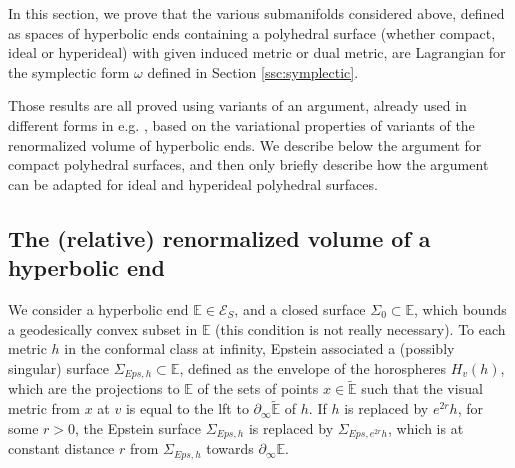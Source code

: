 \documentclass[notitlepage,twoside,a4paper]{amsart}
\theoremstyle{named}
\newcommand{\bE}{{\mathbb E}}
\newcommand{\cE}{{\mathcal E}}
\newcommand{\Sigeps}[1]{{\Sigma_{Eps,#1}}}
\begin{document}
In this section, we prove that the various submanifolds considered above, defined as spaces of hyperbolic ends containing a polyhedral surface (whether compact, ideal or hyperideal) with given induced metric or dual metric, are Lagrangian for the symplectic form $\omega$ defined in Section \ref{ssc:symplectic}.

Those results are all proved using variants of an argument, already used in different forms in e.g. \cite{cp,loustau:complex,loustau:minimal,mazzoli2019-2}, based on the variational properties of variants of the renormalized volume of hyperbolic ends. We describe below the argument for compact polyhedral surfaces, and then only briefly describe how the argument can be adapted for ideal and hyperideal polyhedral surfaces.

\subsection{The (relative) renormalized volume of a hyperbolic end}


We consider a hyperbolic end $\bE\in \cE_S$, and a closed surface $\Sigma_0\subset \bE$, which bounds a geodesically convex subset in $\bE$ (this condition is not really necessary). To each metric $h$ in the conformal class at infinity, Epstein \cite{epstein:envelopes} associated a (possibly singular) surface $\Sigeps{h}\subset \bE$, defined as the envelope of the horospheres $H_v(h)$, which are the projections to $\bE$ of the sets of points $x\in \tilde \bE$ such that the visual metric from $x$ at $v$ is equal to the lft to $\partial_\infty\tilde{\bE}$ of $h$. If $h$ is replaced by $e^{2r}h$, for some $r>0$, the Epstein surface $\Sigeps{h}$ is replaced by $\Sigeps{e^{2r}h}$, which is at constant distance $r$ from $\Sigeps{h}$ towards $\partial_\infty\bE$.
\end{document}
